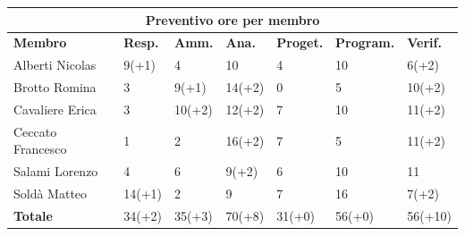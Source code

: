 \documentclass[a4paper, 12pt]{article}
\begin{document}
\begin{center}
	\begin{tabularx}{\textwidth}{|X|X|X|X|X|X|X|}
		\hline
		\multicolumn{7}{|c|}{\textbf{Preventivo ore per membro}}                                      \\
		\hline
		\hline
		\textbf{Membro}  & \textbf{Resp.} & \textbf{Amm.} & \textbf{Ana.} &
		\textbf{Proget.} & \textbf{Program.} & \textbf{Verif.} \\
		\hline
		Alberti Nicolas    	&9(+1) 	&4	&10	&4	&10 &6(+2)	\\
		\hline
		Brotto Romina    	&3 	&9(+1)	&14(+2)	&0	&5 &10(+2)	\\
		\hline
		Cavaliere Erica    	&3 	&10(+2)  &12(+2)  &7 &10 &11(+2)	\\
		\hline
		Ceccato Francesco   &1 	&2  &16(+2) &7 &5 &11(+2)	\\
		\hline
		Salami Lorenzo    	&4 	&6  &9(+2) &6 &10 &11	\\
		\hline
		Soldà Matteo    	&14(+1)	&2  &9 &7 &16 &7(+2)	\\
		\hline
		\hline
		\textbf{Totale} 	&34(+2) &35(+3) &70(+8) &31(+0) &56(+0) &56(+10)	\\
		\hline
	\end{tabularx}\\[8pt]
	\mbox{}\\
\end{center}

\newpage
\end{document}
